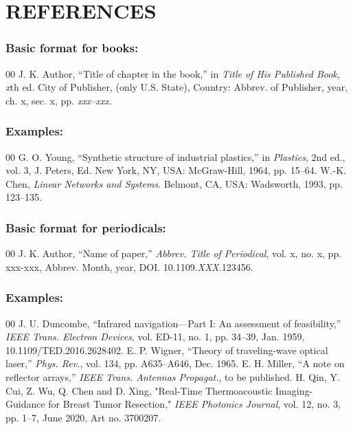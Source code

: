 \documentclass{ieeeojpel}
\begin{document}
\section*{REFERENCES}

\def\refname{\vadjust{\vspace*{-1em}}} %

\subsubsection*{Basic format for books:}

\begin{thebibliography}{00}
 J. K. Author, ``Title of chapter in the book,'' in \textit{Title of His Published Book, x}th ed. City of Publisher,
(only U.S. State), Country: Abbrev. of Publisher, year, ch. x, sec. x, pp.
\textit{xxx--xxx.}
\end{thebibliography}

\subsubsection*{Examples:}

\begin{thebibliography}{00}
 G. O. Young, ``Synthetic structure of industrial
plastics,'' in \emph{Plastics}, 2nd ed., vol. 3, J. Peters, Ed. New York, NY, USA: McGraw-Hill, 1964, pp. 15--64.
 W.-K. Chen, \emph{Linear Networks and Systems}. Belmont, CA, USA: Wadsworth, 1993, pp. 123--135.
\end{thebibliography}

\subsubsection*{Basic format for periodicals:}

\begin{thebibliography}{00}
 J. K. Author, ``Name of paper,'' \textit{Abbrev. Title of Periodical}, vol. x, no. x, pp. xxx-xxx, Abbrev. Month, year, DOI.
10.1109.\textit{XXX}.123456.
\end{thebibliography}

\subsubsection*{Examples:}

\begin{thebibliography}{00}
 J. U. Duncombe, ``Infrared navigation---Part I: An
assessment of feasibility,'' \emph{IEEE Trans. Electron Devices}, vol. ED-11, no. 1, pp. 34--39, Jan. 1959, 10.1109/TED.2016.2628402.
 E. P. Wigner, ``Theory of traveling-wave optical laser,'' 
\emph{Phys. Rev.}, vol. 134, pp. A635--A646, Dec. 1965.
 E. H. Miller, ``A note on reflector arrays,'' \emph{IEEE
Trans. Antennas Propagat.}, to be published.
 H. Qin, Y. Cui, Z. Wu, Q. Chen and D. Xing, "Real-Time
Thermoacoustic Imaging-Guidance for Breast Tumor Resection," \emph{IEEE Photonics Journal}, vol. 12, no. 3, pp. 1--7, June 2020, Art no. 3700207.
\end{thebibliography}
\end{document}
